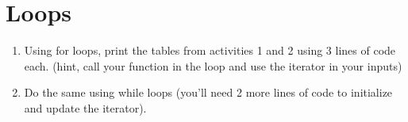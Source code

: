 \documentclass{article}%
\begin{document}
	
	\section{Loops}
	\begin{enumerate}
		\item Using for loops, print the tables from activities 1 and 2 using 3 lines of code each. (hint, call your function in the loop and use the iterator in your inputs)
		\item Do the same using while loops (you'll need 2 more lines of code to initialize and update the iterator).
	\end{enumerate}
	
\end{document}
